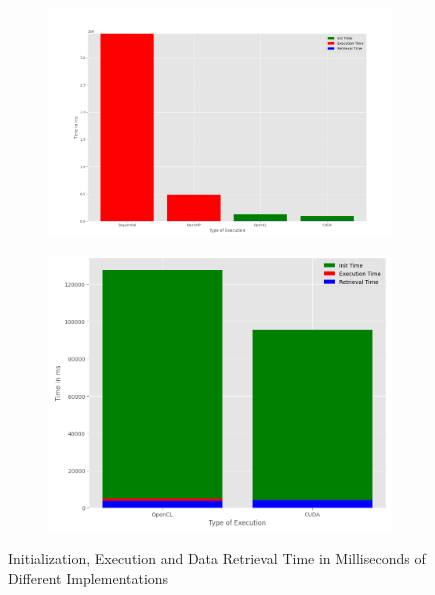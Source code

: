 \documentclass[a4paper,12pt]{llncs}
\numberwithin{equation}{section}
\begin{document}
\begin{figure}[htbp]
  \begin{center}
  \begin{subfigure}{0.45\textwidth}
    \includegraphics[width=\linewidth]{figures/results.png}
    \caption{ }
	\label{subfig:a}
  \end{subfigure}    
  \begin{subfigure}{0.45\textwidth}
    \includegraphics[width=\linewidth]{figures/GPUs_Time.png}
    \caption{ }
	\label{subfig:b}
  \end{subfigure}
    \caption{Initialization, Execution and Data Retrieval Time in Milliseconds of Different Implementations}
    \label{fig:time}
  \end{center}
\end{figure}
\end{document}
